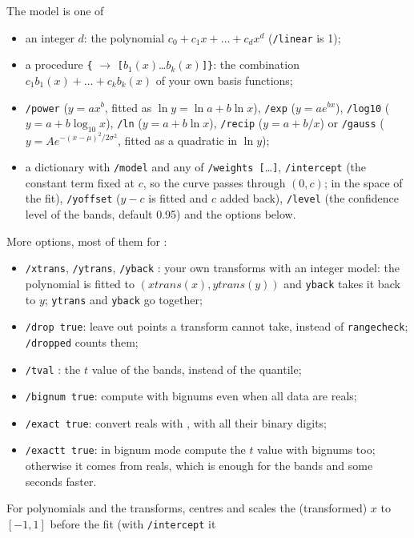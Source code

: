 \documentclass[11pt,english,BCOR=10mm,DIV=12,bibliography=totoc,parskip=false,
   headings=small,headinclude=false,footinclude=false,oneside]{pst-doc}
\newcommand\To{\ensuremath{\to}}
\begin{document}
The model is one of
\begin{itemize}
\item an integer $d$: the polynomial $c_0+c_1x+\dots+c_dx^d$ (\texttt{/linear} is 1);
\item a procedure \texttt{\{} \To{} \texttt{[}$b_1(x)$\dots$b_k(x)$\texttt{]\}}:
  the combination $c_1b_1(x)+\dots+c_kb_k(x)$ of your own basis functions;
\item \texttt{/power} ($y=ax^b$, fitted as $\ln y=\ln a+b\ln x$),
  \texttt{/exp} ($y=ae^{bx}$), \texttt{/log10} ($y=a+b\log_{10}x$),
  \texttt{/ln} ($y=a+b\ln x$), \texttt{/recip} ($y=a+b/x$) or
  \texttt{/gauss} ($y=Ae^{-(x-\mu)^2/2\sigma^2}$, fitted as a quadratic in
  $\ln y$);
\item a dictionary with \texttt{/model} and any of \texttt{/weights [}\dots\texttt{]},
  \texttt{/intercept}  (the constant term fixed at $c$, so the curve
  passes through $(0,c)$; in the space of the fit), \texttt{/yoffset}
   ($y-c$ is fitted and $c$ added back), \texttt{/level}
   (the confidence level of the bands, default 0.95) and the
  options below.
\end{itemize}
More options, most of them for :
\begin{itemize}
\item \texttt{/xtrans}, \texttt{/ytrans}, \texttt{/yback} : your own
  transforms with an integer model: the polynomial is fitted to
  $(\mathit{xtrans}(x),\mathit{ytrans}(y))$ and \texttt{yback} takes it back
  to $y$; \texttt{ytrans} and \texttt{yback} go together;
\item \texttt{/drop true}: leave out points a transform cannot take, instead of
  \texttt{rangecheck}; \texttt{/dropped} counts them;
\item \texttt{/tval} : the $t$ value of the bands, instead of the quantile;
\item \texttt{/bignum true}: compute with bignums even when all data are reals;
\item \texttt{/exact true}: convert reals with , with all their binary digits;
\item \texttt{/exactt true}: in bignum mode compute the $t$ value with bignums
  too; otherwise it comes from reals, which is enough for the bands and
  some seconds faster.
\end{itemize}
For polynomials and the transforms,  centres and scales the
(transformed) $x$ to $[-1,1]$ before the fit (with \texttt{/intercept} it
\end{document}
